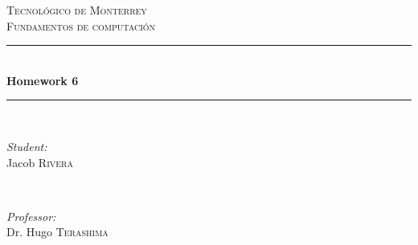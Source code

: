 \documentclass{article}
\begin{document}
\begin{titlepage}

    \newcommand{\HRule}{\rule{\linewidth}{0.5mm}} %

    \center %


    \textsc{\LARGE Tecnológico de Monterrey}\\[1.5cm] %
    \textsc{\Large Fundamentos de computación}\\[0.5cm] %


    \HRule \\[0.4cm]
    { \huge \bfseries Homework 6}\\[0.4cm] %
    \HRule \\[1.5cm]


    \begin{minipage}{0.4\textwidth}
    \begin{flushleft} \large
    \emph{Student:}\\
    Jacob \textsc{Rivera} %
    \end{flushleft}
    \end{minipage}
    ~
    \begin{minipage}{0.4\textwidth}
    \begin{flushright} \large
    \emph{Professor:} \\
    Dr. Hugo \textsc{Terashima} %
    \end{flushright}
    \end{minipage}\\[2cm]


\end{titlepage}
\end{document}
